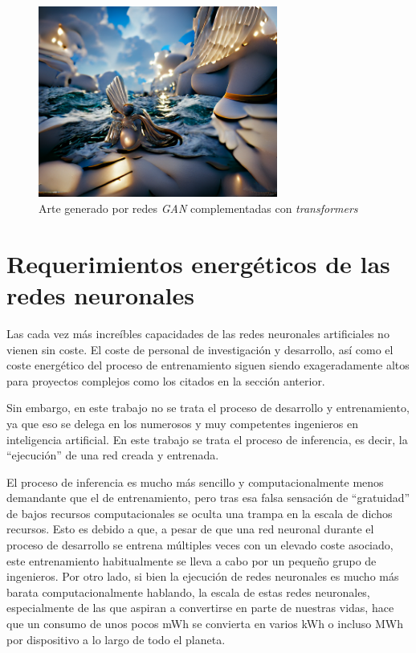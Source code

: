 \begin{figure}[h!]
    \centering
    \includegraphics[width=0.7\textwidth]{img/vqgan_image.png}
    \caption{Arte generado por redes \textit{GAN} complementadas con \textit{transformers}}
    \label{fig:vqgan_image}
\end{figure}

\section{Requerimientos energéticos de las redes neuronales}
\label{sec:requerimientos_energeticos_redes_neuronales}
Las cada vez más increíbles capacidades de las redes neuronales artificiales no vienen sin coste. El coste de personal de investigación y desarrollo, así como el coste energético del proceso de entrenamiento siguen siendo exageradamente altos para proyectos complejos como los citados en la sección anterior.

Sin embargo, en este trabajo no se trata el proceso de desarrollo y entrenamiento, ya que eso se delega en los numerosos y muy competentes ingenieros en inteligencia artificial. En este trabajo se trata el proceso de inferencia, es decir, la ``ejecución'' de una red creada y entrenada.

El proceso de inferencia es mucho más sencillo y computacionalmente menos demandante que el de entrenamiento, pero tras esa falsa sensación de ``gratuidad'' de bajos recursos computacionales se oculta una trampa en la escala de dichos recursos. Esto es debido a que, a pesar de que una red neuronal durante el proceso de desarrollo se entrena múltiples veces con un elevado coste asociado, este entrenamiento habitualmente se lleva a cabo por un pequeño grupo de ingenieros. Por otro lado, si bien la ejecución de redes neuronales es mucho más barata computacionalmente hablando, la escala de estas redes neuronales, especialmente de las que aspiran a convertirse en parte de nuestras vidas, hace que un consumo de unos pocos mWh se convierta en varios kWh o incluso MWh por dispositivo a lo largo de todo el planeta.

